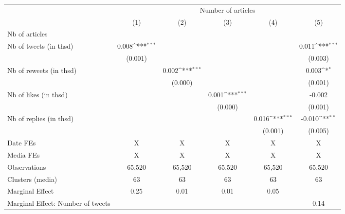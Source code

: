 {
\def\sym#1{\ifmmode^{#1}\else\(^{#1}\)\fi}
\begin{tabular}{l*{5}{c}}
\hline\hline
                    &\multicolumn{5}{c}{Number of articles}                                                                       \\\cmidrule(lr){2-6}
                    &\multicolumn{1}{c}{(1)}         &\multicolumn{1}{c}{(2)}         &\multicolumn{1}{c}{(3)}         &\multicolumn{1}{c}{(4)}         &\multicolumn{1}{c}{(5)}         \\
\hline
Nb of articles      &                     &                     &                     &                     &                     \\
Nb of tweets (in thsd)&       0.008\sym{***}&                     &                     &                     &       0.011\sym{***}\\
                    &     (0.001)         &                     &                     &                     &     (0.003)         \\
Nb of reweets (in thsd)&                     &       0.002\sym{***}&                     &                     &       0.003\sym{*}  \\
                    &                     &     (0.000)         &                     &                     &     (0.001)         \\
Nb of likes (in thsd)&                     &                     &       0.001\sym{***}&                     &      -0.002         \\
                    &                     &                     &     (0.000)         &                     &     (0.001)         \\
Nb of replies (in thsd)&                     &                     &                     &       0.016\sym{***}&      -0.010\sym{**} \\
                    &                     &                     &                     &     (0.001)         &     (0.005)         \\
\hline
Date FEs            &           X         &           X         &           X         &           X         &           X         \\
Media FEs           &           X         &           X         &           X         &           X         &           X         \\
Observations        &      65,520         &      65,520         &      65,520         &      65,520         &      65,520         \\
Clusters (media)    &          63         &          63         &          63         &          63         &          63         \\
Marginal Effect     &        0.25         &        0.01         &        0.01         &        0.05         &                     \\
Marginal Effect: Number of tweets&                     &                     &                     &                     &        0.14         \\
\hline\hline
\end{tabular}
}
